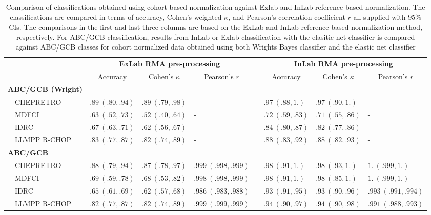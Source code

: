 \begin{table}[!tbp]
{\scriptsize
\caption{Comparison of classifications obtained using cohort based
normalization against Exlab and InLab reference based normalization.
The classifications are compared in terms of accuracy,
Cohen's weighted $\kappa$, and Pearson's correlation coefficient $r$ all
supplied with $95\%$ CIs. The comparisons in the first and last three columns
are based on the ExLab and InLab reference based
normalization method, respectively. For ABC/GCB classification, results
from InLab or Exlab classification with the elasitic net classifier is 
compared against ABC/GCB classes for cohort normalized data obtained using both
Wrights Bayes classifier and the elastic net classifier\label{tab:classALL}} 
\begin{center}
\begin{tabular}{llllclll}
\hline\hline
\multicolumn{1}{l}{\bfseries }&\multicolumn{3}{c}{\bfseries ExLab RMA pre-processing}&\multicolumn{1}{c}{\bfseries }&\multicolumn{3}{c}{\bfseries InLab RMA pre-processing}\tabularnewline
\cline{2-4} \cline{6-8}
\multicolumn{1}{l}{}&\multicolumn{1}{c}{Accuracy}&\multicolumn{1}{c}{Cohen's $\kappa$}&\multicolumn{1}{c}{Pearson's $r$}&\multicolumn{1}{c}{}&\multicolumn{1}{c}{Accuracy}&\multicolumn{1}{c}{Cohen's $\kappa$}&\multicolumn{1}{c}{Pearson's $r$}\tabularnewline
\hline
{\bfseries ABC/GCB (Wright)}&&&&&&&\tabularnewline
~~CHEPRETRO&$.89~(.80, .94)$&$.89~(.79, .98)$&-&&$.97~(.88, 1.)$&$.97~(.90, 1.)$&-\tabularnewline
~~MDFCI&$.63~(.52, .73)$&$.52~(.40, .64)$&-&&$.72~(.59, .83)$&$.71~(.55, .86)$&-\tabularnewline
~~IDRC&$.67~(.63, .71)$&$.62~(.56, .67)$&-&&$.84~(.80, .87)$&$.82~(.77, .86)$&-\tabularnewline
~~LLMPP R-CHOP&$.83~(.77, .87)$&$.82~(.74, .89)$&-&&$.88~(.83, .92)$&$.88~(.82, .93)$&-\tabularnewline
\hline
{\bfseries ABC/GCB}&&&&&&&\tabularnewline
~~CHEPRETRO&$.88~(.79, .94)$&$.87~(.78, .97)$&$.999~(.998, .999)$&&$.98~(.91, 1.)$&$.98~(.93, 1.)$&$1.~(.999, 1.)$\tabularnewline
~~MDFCI&$.69~(.59, .78)$&$.68~(.53, .82)$&$.998~(.998, .999)$&&$.98~(.91, 1.)$&$.98~(.85, 1.)$&$1.~(.999, 1.)$\tabularnewline
~~IDRC&$.65~(.61, .69)$&$.62~(.57, .68)$&$.986~(.983, .988)$&&$.93~(.91, .95)$&$.93~(.90, .96)$&$.993~(.991, .994)$\tabularnewline
~~LLMPP R-CHOP&$.82~(.77, .87)$&$.82~(.74, .89)$&$.999~(.999, .999)$&&$.94~(.90, .97)$&$.94~(.90, .98)$&$.991~(.988, .993)$\tabularnewline

\end{tabular}
\end{center}}
\end{table}
